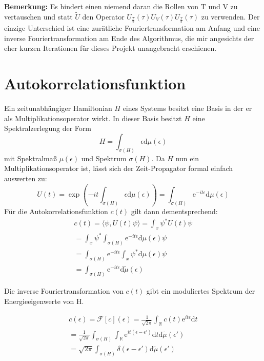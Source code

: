\documentclass[10pt,a4paper,german]{scrartcl}
\begin{document}
		\textbf{Bemerkung:} Es hindert einen niemend daran die Rollen von T und V zu
		vertauschen	und statt $\tilde{U}$ den Operator
		$U_{\frac{T}{2}}(\tau) U_V(\tau) U_{\frac{T}{2}}(\tau)$ zu verwenden. Der einzige
		Unterschied ist eine zurätliche Fouriertransformation am Anfang und eine
		inverse Fouriertransformation am Ende des Algorithmus, die mir angesichts der
		eher kurzen Iterationen für dieses Projekt unangebracht erschienen.


  \section{Autokorrelationsfunktion}
		Ein zeitunabhängiger Hamiltonian $H$ eines Systems besitzt eine Basis in der er als
		Multiplikationsoperator wirkt. In dieser Basis besitzt $H$ eine Spektralzerlegung
		der Form
		\begin{equation*}
			H = \int_{\sigma(H)}{\epsilon \mathrm{d}\mu(\epsilon)}
		\end{equation*}
		mit Spektralmaß $\mu(\epsilon)$ und Spektrum $\sigma(H)$.
		Da $H$ nun ein Multiplikationsoperator ist, lässt sich der
		Zeit-Propagator formal einfach auswerten zu:
		\begin{equation*}
			U(t)=\exp\left(
				-i t \int_{\sigma(H)}{\epsilon \mathrm{d}\mu(\epsilon)}
			\right)
			=\int_{\sigma(H)}{\mathrm{e}^{-i t \epsilon} \mathrm{d}\mu(\epsilon)}
		\end{equation*}
		Für die Autokorrelationsfunktion $c(t)$
		gilt dann dementsprechend:
		\begin{multline}
			\label{eq:corr}
			c(t) = \langle \psi,U(t) \psi\rangle
					 = \int_{x} \psi^{*} U(t) \psi \\
					 = \int_{x} \psi^{*}
					 	  \int_{\sigma(H)}{\mathrm{e}^{-i t \epsilon}
					 	 	   \mathrm{d}\mu(\epsilon)} \psi \\
					 = \int_{\sigma(H)}{
					 			\mathrm{e}^{-i t \epsilon}
					 			\int_{x} \psi^{*}
					 	 	   \mathrm{d}\mu(\epsilon)} \psi \\
					 = \int_{\sigma(H)}{
					 			\mathrm{e}^{-i t \epsilon}
					 			\mathrm{d} \tilde{\mu}(\epsilon)}
		\end{multline}

		Die inverse Fouriertransformation von $c(t)$ gibt ein moduliertes Spektrum
		der Energieeigenwerte von H.

		\begin{multline}
			\label{eq:corrft}
			c(\epsilon) = \mathcal{F}[c](\epsilon)
			      = \frac{1}{\sqrt{2 \pi}}
			     		\int_{\mathbb{R}} c(t) \mathrm{e}^{it \epsilon} \mathrm{d}t\\
			     = \frac{1}{\sqrt{2 \pi}}
		     			\int_{\sigma(H)}
				     		\int_{\mathbb{R}} \mathrm{e}^{i t (\epsilon -\epsilon')}	\mathrm{d}t
					 		\mathrm{d} \tilde{\mu}(\epsilon')\\
			     = \sqrt{2 \pi}
			     		\int_{\sigma(H)} \delta(\epsilon -\epsilon')
					 		\mathrm{d} \tilde{\mu}(\epsilon')
		\end{multline}
\end{document}
